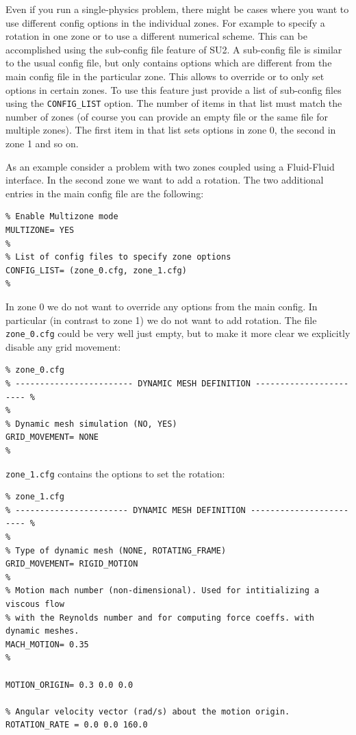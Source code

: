 \documentclass{article}
\begin{document}
Even if you run a single-physics problem, there might be cases where you want to use different config options in the individual zones. For example to specify a rotation in one zone or to use a different numerical scheme. This can be accomplished using the sub-config file feature of SU2. A sub-config file is similar to the usual config file, but only contains options which are different from the main config file in the particular zone. This allows to override or to only set options in certain zones. To use this feature just provide a list of sub-config files using the \verb|CONFIG_LIST| option. The number of items in that list must match the number of zones (of course you can provide an empty file or the same file for multiple zones). The first item in that list sets options in zone 0, the second in zone 1 and so on.

As an example consider a problem with two zones coupled using a Fluid-Fluid interface. In the second zone we want to add a rotation. The two additional entries in the main config file are the following:

\begin{lstlisting}
% Enable Multizone mode
MULTIZONE= YES
%
% List of config files to specify zone options
CONFIG_LIST= (zone_0.cfg, zone_1.cfg)
%

\end{lstlisting}

In zone 0 we do not want to override any options from the main config. In particular (in contrast to zone 1) we do not want to add rotation. The file \verb|zone_0.cfg| could be very well just empty, but to make it more clear we explicitly disable any grid movement:

\begin{lstlisting}
% zone_0.cfg
% ------------------------ DYNAMIC MESH DEFINITION ----------------------- %
%
% Dynamic mesh simulation (NO, YES)
GRID_MOVEMENT= NONE
%

\end{lstlisting}

\verb|zone_1.cfg| contains the options to set the rotation:

\begin{lstlisting}
% zone_1.cfg
% ----------------------- DYNAMIC MESH DEFINITION ------------------------ %
%
% Type of dynamic mesh (NONE, ROTATING_FRAME)
GRID_MOVEMENT= RIGID_MOTION
%
% Motion mach number (non-dimensional). Used for intitializing a viscous flow
% with the Reynolds number and for computing force coeffs. with dynamic meshes.
MACH_MOTION= 0.35
%

MOTION_ORIGIN= 0.3 0.0 0.0

% Angular velocity vector (rad/s) about the motion origin. 
ROTATION_RATE = 0.0 0.0 160.0

\end{lstlisting}
\end{document}
